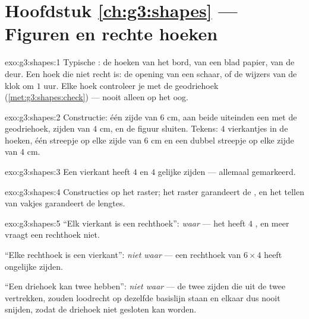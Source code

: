 \section*{Hoofdstuk \ref{ch:g3:shapes} --- Figuren en rechte hoeken}

\begin{solution}{exo:g3:shapes:1}
Typische : de hoeken van het bord, van een blad papier, van
de deur. Een hoek die niet recht is: de opening van een schaar, of de
wijzers van de klok om $1$ uur. Elke hoek controleer je met de
geodriehoek (\cref{met:g3:shapes:check}) --- nooit alleen op het oog.
\end{solution}

\begin{solution}{exo:g3:shapes:2}
Constructie: één zijde van $6$ cm, aan beide uiteinden een  met
de geodriehoek, zijden van $4$ cm, en de figuur sluiten. Tekens: $4$
vierkantjes in de hoeken, één streepje op elke zijde van $6$ cm en een
dubbel streepje op elke zijde van $4$ cm.
\end{solution}

\begin{solution}{exo:g3:shapes:3}
Een vierkant heeft $4$  en $4$ gelijke zijden --- allemaal
gemarkeerd.
\end{solution}

\begin{solution}{exo:g3:shapes:4}
Constructies op het raster; het raster garandeert de , en het
tellen van vakjes garandeert de lengtes.
\end{solution}

\begin{solution}{exo:g3:shapes:5}
``Elk vierkant is een rechthoek'': \emph{waar} --- het heeft $4$ , en meer vraagt een rechthoek niet.

``Elke rechthoek is een vierkant'': \emph{niet waar} --- een rechthoek van
$6 \times 4$ heeft ongelijke zijden.

``Een driehoek kan twee  hebben'': \emph{niet waar} --- de
twee zijden die uit de twee  vertrekken, zouden loodrecht op
dezelfde basislijn staan en elkaar dus nooit snijden, zodat de driehoek
niet gesloten kan worden.
\end{solution}

